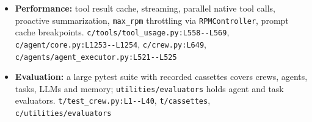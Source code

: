\begin{itemize}
\item \textbf{Performance:} tool result cache, streaming, parallel native tool calls, proactive summarization, \texttt{max\_\allowbreak{}rpm} throttling via \texttt{RPMController}, prompt cache breakpoints. \texttt{c/\allowbreak{}tools/\allowbreak{}tool\_\allowbreak{}usage.\allowbreak{}py:\allowbreak{}L558-\allowbreak{}-\allowbreak{}L569}, \texttt{c/\allowbreak{}agent/\allowbreak{}core.\allowbreak{}py:\allowbreak{}L1253-\allowbreak{}-\allowbreak{}L1254}, \texttt{c/\allowbreak{}crew.\allowbreak{}py:\allowbreak{}L649}, \texttt{c/\allowbreak{}agents/\allowbreak{}agent\_\allowbreak{}executor.\allowbreak{}py:\allowbreak{}L521-\allowbreak{}-\allowbreak{}L525}
\item \textbf{Evaluation:} a large pytest suite with recorded cassettes covers crews, agents, tasks, LLMs and memory; \texttt{utilities/\allowbreak{}evaluators} holds agent and task evaluators. \texttt{t/\allowbreak{}test\_\allowbreak{}crew.\allowbreak{}py:\allowbreak{}L1-\allowbreak{}-\allowbreak{}L40}, \texttt{t/\allowbreak{}cassettes}, \texttt{c/\allowbreak{}utilities/\allowbreak{}evaluators}
\end{itemize}

